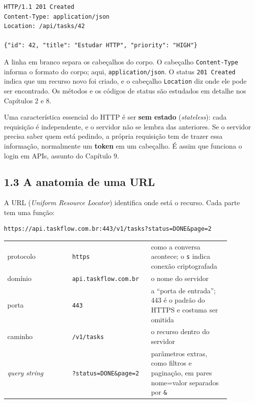 \begin{codigo}
\begin{Verbatim}[breaklines=true, breaksymbolleft={}, fontsize=\footnotesize]
HTTP/1.1 201 Created
Content-Type: application/json
Location: /api/tasks/42

{"id": 42, "title": "Estudar HTTP", "priority": "HIGH"}
\end{Verbatim}
\end{codigo}

A linha em branco separa os cabeçalhos do corpo. O cabeçalho \texttt{Content-Type} informa o formato do corpo; aqui, \texttt{application/json}. O status \texttt{201 Created} indica que um recurso novo foi criado, e o cabeçalho \texttt{Location} diz onde ele pode ser encontrado. Os métodos e os códigos de status são estudados em detalhe nos Capítulos 2 e 8.

Uma característica essencial do HTTP é ser \textbf{sem estado} (\textit{stateless}): cada requisição é independente, e o servidor não se lembra das anteriores. Se o servidor precisa saber quem está pedindo, a própria requisição tem de trazer essa informação, normalmente um \textbf{token} em um cabeçalho. É assim que funciona o login em APIs, assunto do Capítulo 9.

\subsection{1.3 A anatomia de uma URL}

A URL (\textit{Uniform Resource Locator}) identifica onde está o recurso. Cada parte tem uma função:

\begin{codigo}
\begin{Verbatim}[breaklines=true, breaksymbolleft={}, fontsize=\footnotesize]
https://api.taskflow.com.br:443/v1/tasks?status=DONE&page=2
\end{Verbatim}
\end{codigo}

\begin{center}
\begin{tabular}{@{}P{0.27\linewidth}P{0.3\linewidth}P{0.33\linewidth}@{}}
\toprule
{}
 &  &  \\
\midrule
protocolo & \texttt{https} & como a conversa acontece; o \texttt{s} indica conexão criptografada \\
 domínio & \texttt{api.taskflow.com.br} & o nome do servidor \\
porta & \texttt{443} & a ``porta de entrada''; 443 é o padrão do HTTPS e costuma ser omitida \\
 caminho & \texttt{/v1/tasks} & o recurso dentro do servidor \\
\textit{query string} & \texttt{?status=DONE\&page=2} & parâmetros extras, como filtros e paginação, em pares nome=valor separados por \texttt{\&} \\
\bottomrule
\end{tabular}
\end{center}

